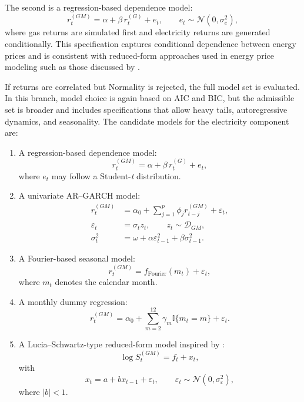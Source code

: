 \documentclass[authoryear,preprint,review,10pt]{elsarticle}
\begin{document}
The second is a regression-based dependence model:
\begin{equation}
        r_t^{(GM)} = \alpha + \beta\, r_t^{(G)} + e_t,
        \qquad e_t \sim \mathcal{N}(0,\sigma_e^2),
\end{equation}
where gas returns are simulated first and electricity returns are generated conditionally. This specification captures conditional dependence between energy prices and is consistent with reduced-form approaches used in energy price modeling such as those discussed by \citet{tan2010day}.

If returns are correlated but Normality is rejected, the full model set is evaluated. In this branch, model choice is again based on AIC and BIC, but the admissible set is broader and includes specifications that allow heavy tails, autoregressive dynamics, and seasonality. The candidate models for the electricity component are:

\begin{enumerate}
    \item A regression-based dependence model:
    \begin{equation}
        r_t^{(GM)} = \alpha + \beta\, r_t^{(G)} + e_t,
    \end{equation}
    where $e_t$ may follow a Student-\emph{t} distribution.

    \item A univariate AR--GARCH model:
    \begin{align}
        r_t^{(GM)} &= \alpha_0 + \sum_{j=1}^p \phi_j r_{t-j}^{(GM)} + \varepsilon_t,\\
        \varepsilon_t &= \sigma_t z_t,\qquad z_t \sim \mathcal{D}_{GM},\\
        \sigma_t^2 &= \omega + \alpha \varepsilon_{t-1}^2 + \beta \sigma_{t-1}^2.
    \end{align}

    \item A Fourier-based seasonal model:
    \begin{equation}
        r_t^{(GM)} = f_{\text{Fourier}}(m_t) + \varepsilon_t,
    \end{equation}
    where $m_t$ denotes the calendar month.

    \item A monthly dummy regression:
    \begin{equation}
        r_t^{(GM)} = \alpha_0 + \sum_{m=2}^{12} \gamma_m \mathbb{I}\{m_t=m\} + \varepsilon_t.
    \end{equation}

    \item A Lucia--Schwartz-type reduced-form model inspired by \citet{lucia2002electricity}:
    \begin{equation}
        \log S_t^{(GM)} = f_t + x_t,
    \end{equation}
    with
    \begin{equation}
        x_t = a + b x_{t-1} + \varepsilon_t,
        \qquad \varepsilon_t \sim \mathcal{N}(0,\sigma_\varepsilon^2),
    \end{equation}
    where $|b|<1$.
\end{enumerate}
\end{document}
